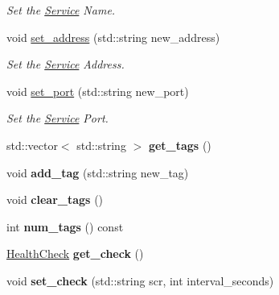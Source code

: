 \begin{DoxyCompactItemize}
\begin{DoxyCompactList}\small\item\em Set the \hyperlink{classService}{Service} Name. \end{DoxyCompactList}\item 
\hypertarget{classService_a5f7aecf124823ad22e0c5265eb895cdc}{void \hyperlink{classService_a5f7aecf124823ad22e0c5265eb895cdc}{set\-\_\-address} (std\-::string new\-\_\-address)}\label{classService_a5f7aecf124823ad22e0c5265eb895cdc}

\begin{DoxyCompactList}\small\item\em Set the \hyperlink{classService}{Service} Address. \end{DoxyCompactList}\item 
\hypertarget{classService_a7bacad58f3bfb9f8d0bd757c89c0e4c4}{void \hyperlink{classService_a7bacad58f3bfb9f8d0bd757c89c0e4c4}{set\-\_\-port} (std\-::string new\-\_\-port)}\label{classService_a7bacad58f3bfb9f8d0bd757c89c0e4c4}

\begin{DoxyCompactList}\small\item\em Set the \hyperlink{classService}{Service} Port. \end{DoxyCompactList}\item 
\hypertarget{classService_ab3decdaff5d89934fe6b190c5bd74d57}{std\-::vector$<$ std\-::string $>$ {\bfseries get\-\_\-tags} ()}\label{classService_ab3decdaff5d89934fe6b190c5bd74d57}

\item 
\hypertarget{classService_ac700081515b84a002e4f9953c931727a}{void {\bfseries add\-\_\-tag} (std\-::string new\-\_\-tag)}\label{classService_ac700081515b84a002e4f9953c931727a}

\item 
\hypertarget{classService_a0bb490a55ed7bb2d82a760f980539bb0}{void {\bfseries clear\-\_\-tags} ()}\label{classService_a0bb490a55ed7bb2d82a760f980539bb0}

\item 
\hypertarget{classService_a7585975846335020ffe5b238bdb238f1}{int {\bfseries num\-\_\-tags} () const }\label{classService_a7585975846335020ffe5b238bdb238f1}

\item 
\hypertarget{classService_a5e8054b562abad283350834a5224f661}{\hyperlink{structHealthCheck}{Health\-Check} {\bfseries get\-\_\-check} ()}\label{classService_a5e8054b562abad283350834a5224f661}

\item 
\hypertarget{classService_a410b149173c0a01d4703f4f9312ff6ef}{void {\bfseries set\-\_\-check} (std\-::string scr, int interval\-\_\-seconds)}\label{classService_a410b149173c0a01d4703f4f9312ff6ef}

\end{DoxyCompactItemize}


